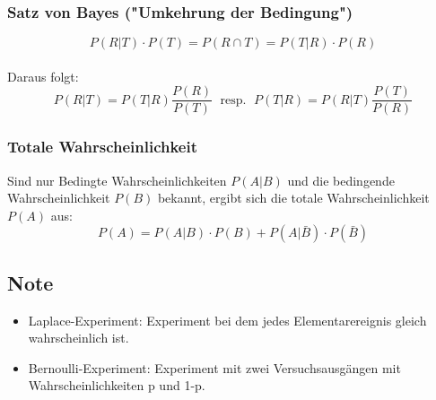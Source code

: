 \documentclass[margin=normal]{tex/hsrzf}
\begin{document}
\subsubsection*{Satz von Bayes ("Umkehrung der Bedingung")}
$$P(R|T) \cdot P(T) = P(R \cap T) = P(T|R) \cdot P(R)$$
\\ Daraus folgt: $$P(R|T) = P(T|R) \frac{P(R)}{P(T)}\;
\textrm{ resp. } \; P(T|R) = P(R|T) \frac{P(T)}{P(R)}$$ 
\subsubsection{Totale Wahrscheinlichkeit}
Sind nur Bedingte Wahrscheinlichkeiten $P(A|B)$ und die bedingende Wahrscheinlichkeit 
$P(B)$ bekannt, ergibt sich die totale Wahrscheinlichkeit $P(A)$ aus:
$$P(A) = P(A|B) \cdot P(B) + P(A|\bar{B})\cdot P(\bar{B})$$
\subsection*{Note}
\begin{itemize}
    \item Laplace-Experiment: Experiment bei dem jedes Elementarereignis gleich wahrscheinlich ist.
    \item Bernoulli-Experiment: Experiment mit zwei Versuchsausgängen mit Wahrscheinlichkeiten p und 1-p.
\end{itemize}
\end{document}
